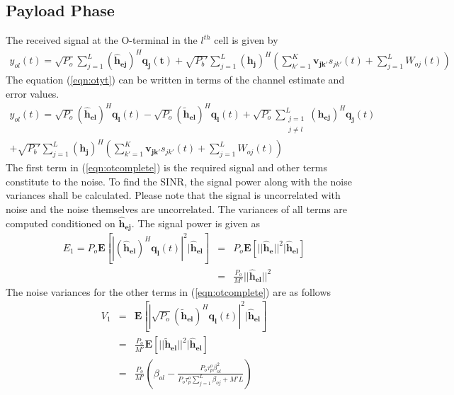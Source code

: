 \documentclass[10pt, a4paper, twoside,fleqn]{article}
\begin{document}
\subsection{Payload Phase}

The received signal at the O-terminal in the $l^{th}$ cell is given by
\begin{eqnarray}\label{eqn:otyt}
 y_{ol}(t) = \sqrt{P_o} \sum_{j=1}^{L} (\mathbf{\hat h_{ej}})^H \mathbf{q_j(t)}
            + \sqrt{P_b'} \sum_{j=1}^{L} (\mathbf{h_j})^H \left(\sum_{k'=1}^{K} \mathbf{v_{jk'}} s_{jk'}(t) + \sum_{j=1}^{L}W_{oj}(t)  \right)
\end{eqnarray} 
The equation (\ref{eqn:otyt}) can be written in terms of the channel estimate and error values.
\begin{eqnarray}\label{eqn:otcomplete}
  y_{ol}(t)= \sqrt{P_o} (\mathbf{\hat h_{el}})^H \mathbf{q_l}(t) 
	    - \sqrt{P_o}(\mathbf{\widetilde{h}_{el}})^H\mathbf{q_l}(t)
	    +\sqrt{P_o} \sum_{\substack{j=1 \\ j \neq l}}^{L} (\mathbf{h_{ej}})^H\mathbf{q_{j}}(t) \nonumber \\
            + \sqrt{P_b'} \sum_{j=1}^{L} (\mathbf{h_j})^H \left(\sum_{k'=1}^{K} \mathbf{v_{jk'}} s_{jk'}(t) 
	    + \sum_{j=1}^{L}W_{oj}(t)  \right)            
\end{eqnarray}
The first term in (\ref{eqn:otcomplete}) is the required signal and other terms constitute to the noise. To find the SINR, the signal power along with the noise variances shall be calculated. Please note that the signal is uncorrelated with noise and the noise themselves are uncorrelated.
The variances of all terms are computed conditioned on $\mathbf{\hat h_{ej}}$. The signal power is given as
\begin{eqnarray}
	E_1 = P_o\mathbf{E}[|(\mathbf{\hat h_{el}})^H \mathbf{q_l}(t)|^2 | \mathbf{\hat h_{el}}] &=& P_o\mathbf{E}[||\mathbf{\hat h_e}||^2 | \mathbf{\hat h_{el}}] \nonumber \\
                                                                                           &=& \frac{P_o}{M'} ||\mathbf{\hat h_{el}}||^2
\end{eqnarray}
The noise variances for the other terms in (\ref{eqn:otcomplete}) are as follows
\begin{eqnarray}\label{eqn:otv1}
	V_1 &=& \mathbf{E}[|\sqrt{P_o}(\mathbf{\widetilde{h}_{el}})^H \mathbf{q_l}(t)|^2|\mathbf{\hat h_{el}}] \nonumber \\
            &=& \frac{P_o}{M'} \mathbf{E}[||\mathbf{\widetilde{h}_{el}}||^2 |\mathbf{\hat h_{el}}] \nonumber \\
            &=& \frac{P_o}{M'}\left(\beta_{ol}-\frac{P_o\tau_p^o\beta^2_{ol}}{P_o\tau_p^o\sum_{j=1}^{L}\beta_{oj}+M'L}\right)          
\end{eqnarray}
\end{document}

